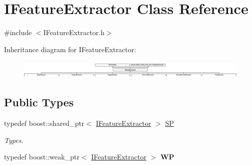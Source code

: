 \hypertarget{class_i_feature_extractor}{}\section{I\+Feature\+Extractor Class Reference}
\label{class_i_feature_extractor}


{\ttfamily \#include $<$I\+Feature\+Extractor.\+h$>$}

Inheritance diagram for I\+Feature\+Extractor\+:\begin{figure}[H]
\begin{center}
\leavevmode
\includegraphics[height=0.875000cm]{class_i_feature_extractor}
\end{center}
\end{figure}
\subsection*{Public Types}
\begin{DoxyCompactItemize}
\item 
\mbox{\label{class_i_feature_extractor_accaef91768ee64d51b4dc959f36e9f08}} 
typedef boost\+::shared\+\_\+ptr$<$ \hyperlink{class_i_feature_extractor}{I\+Feature\+Extractor} $>$ \hyperlink{class_i_feature_extractor_accaef91768ee64d51b4dc959f36e9f08}{SP}
\begin{DoxyCompactList}\small\item\em Types. \end{DoxyCompactList}\item 
\mbox{\label{class_i_feature_extractor_a2b42ce26f52c342dd815839af50f3402}} 
typedef boost\+::weak\+\_\+ptr$<$ \hyperlink{class_i_feature_extractor}{I\+Feature\+Extractor} $>$ {\bfseries WP}
\end{DoxyCompactItemize}
